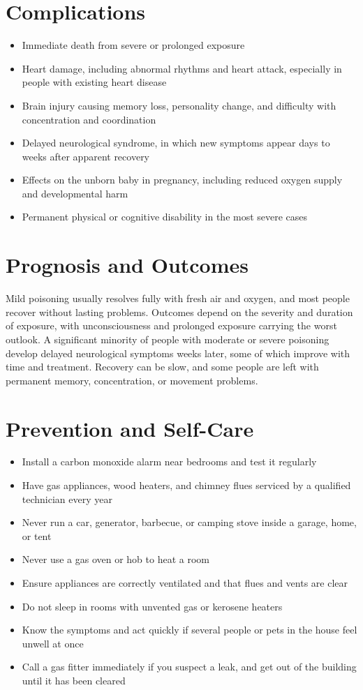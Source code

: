 \section*{Complications}
\begin{itemize}
    \item Immediate death from severe or prolonged exposure
    \item Heart damage, including abnormal rhythms and heart attack, especially in people with existing heart disease
    \item Brain injury causing memory loss, personality change, and difficulty with concentration and coordination
    \item Delayed neurological syndrome, in which new symptoms appear days to weeks after apparent recovery
    \item Effects on the unborn baby in pregnancy, including reduced oxygen supply and developmental harm
    \item Permanent physical or cognitive disability in the most severe cases
\end{itemize}

\section*{Prognosis and Outcomes}
Mild poisoning usually resolves fully with fresh air and oxygen, and most people recover without lasting problems. Outcomes depend on the severity and duration of exposure, with unconsciousness and prolonged exposure carrying the worst outlook. A significant minority of people with moderate or severe poisoning develop delayed neurological symptoms weeks later, some of which improve with time and treatment. Recovery can be slow, and some people are left with permanent memory, concentration, or movement problems.

\section*{Prevention and Self-Care}
\begin{itemize}
    \item Install a carbon monoxide alarm near bedrooms and test it regularly
    \item Have gas appliances, wood heaters, and chimney flues serviced by a qualified technician every year
    \item Never run a car, generator, barbecue, or camping stove inside a garage, home, or tent
    \item Never use a gas oven or hob to heat a room
    \item Ensure appliances are correctly ventilated and that flues and vents are clear
    \item Do not sleep in rooms with unvented gas or kerosene heaters
    \item Know the symptoms and act quickly if several people or pets in the house feel unwell at once
    \item Call a gas fitter immediately if you suspect a leak, and get out of the building until it has been cleared
\end{itemize}

